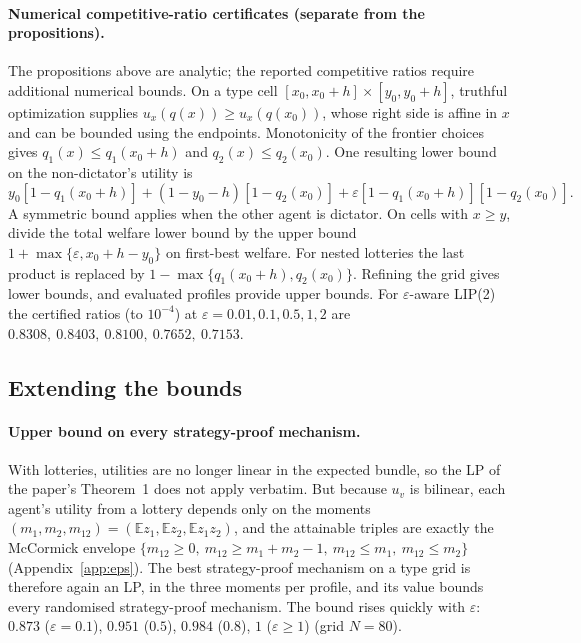 \paragraph{Numerical competitive-ratio certificates (separate from the propositions).}
The propositions above are analytic; the reported competitive ratios
require additional numerical bounds. On a type cell
$[x_0,x_0+h]\times[y_0,y_0+h]$, truthful optimization supplies
$u_x(q(x))\ge u_x(q(x_0))$, whose right side is affine in $x$ and
can be bounded using the endpoints. Monotonicity of the frontier choices
gives $q_1(x)\le q_1(x_0+h)$ and $q_2(x)\le q_2(x_0)$.
One resulting lower bound on the non-dictator's utility is
\[
y_0[1-q_1(x_0+h)]+(1-y_0-h)[1-q_2(x_0)]
+\varepsilon[1-q_1(x_0+h)][1-q_2(x_0)].
\]
A symmetric bound applies when the other agent is dictator. On cells
with $x\ge y$, divide the total welfare lower bound by the upper bound
$1+\max\{\varepsilon,x_0+h-y_0\}$ on first-best welfare.
For nested lotteries the last product is replaced by
$1-\max\{q_1(x_0+h),q_2(x_0)\}$. Refining the grid gives lower
bounds, and evaluated profiles provide upper bounds. For $\varepsilon$-aware LIP(2) the certified ratios (to $10^{-4}$) at
$\varepsilon=0.01,0.1,0.5,1,2$ are $0.8308,\ 0.8403,\ 0.8100,\ 0.7652,\ 0.7153$.

\subsection{Extending the bounds}

\paragraph{Upper bound on every strategy-proof mechanism.} With lotteries, utilities are no
longer linear in the expected bundle, so the LP of the paper's Theorem~1 does not apply verbatim. But because
$u_v$ is bilinear, each agent's utility from a lottery depends only on the moments
$(m_1,m_2,m_{12})=(\mathbb E z_1,\mathbb E z_2,\mathbb E z_1z_2)$, and the attainable triples are
exactly the McCormick envelope $\{m_{12}\ge0,\ m_{12}\ge m_1+m_2-1,\ m_{12}\le m_1,\ m_{12}\le m_2\}$
(Appendix~\ref{app:eps}). The best strategy-proof mechanism on a type grid is therefore
again an LP, in the three moments per profile, and its value bounds every randomised
strategy-proof mechanism. The bound rises quickly with $\varepsilon$: $0.873$ ($\varepsilon=0.1$),
$0.951$ ($0.5$), $0.984$ ($0.8$), $1$ ($\varepsilon\ge1$) (grid $N=80$).

